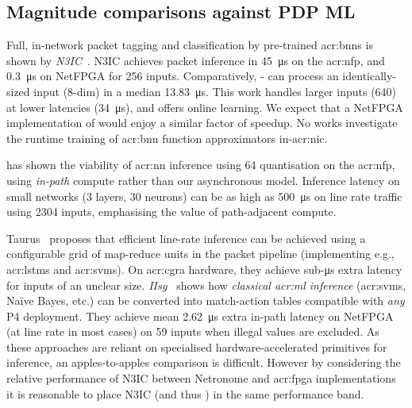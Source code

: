\subsection{Magnitude comparisons against PDP ML}
Full, in-network packet tagging and classification by pre-trained \glspl{acr:bnn} is shown by \emph{N3IC}~\parencite{DBLP:journals/corr/abs-2009-02353}.
N3IC achieves packet inference in \qty{45}{\micro\second} on the \gls{acr:nfp}, and \qty{0.3}{\micro\second} on NetFPGA for \qty{256}{\bit} inputs.
Comparatively, \approachshort{}-\Coopfw{} can process an identically-sized input (8-dim) in a median \qty{13.83}{\micro\second}.
This work handles larger inputs (\qty{640}{\bit}) at lower latencies (\qty{34}{\micro\second}), and offers online learning.
We expect that a NetFPGA implementation of \approachshort{} would enjoy a similar factor of speedup.
No works investigate the runtime training of \gls{acr:bnn} function approximators in-\gls{acr:nic}.

\textcite{langlet-ml-netronome} has shown the viability of \gls{acr:nn} inference using \qty{64}{\bit} quantisation on the \gls{acr:nfp}, using \emph{in-path} compute rather than our asynchronous model.
Inference latency on small networks (3 layers, \num{30} neurons) can be as high as \qty{500}{\micro\second} on line rate traffic using \qty{2304}{\bit} inputs, emphasising the value of path-adjacent compute.

Taurus~\parencite{DBLP:journals/corr/abs-2002-08987} proposes that efficient line-rate inference can be achieved using a configurable grid of map-reduce units in the packet pipeline (implementing e.g., \glspl{acr:lstm} and \glspl{acr:svm}).
On \gls{acr:cgra} hardware, they achieve sub-\si{\micro\second} extra latency for inputs of an unclear size.
\emph{IIsy}~\parencite{DBLP:conf/hotnets/XiongZ19} shows how \emph{classical \gls{acr:ml} inference} (\glspl{acr:svm}, Na\"{i}ve Bayes, etc.) can be converted into match-action tables compatible with \emph{any} P4 deployment.
They achieve mean \qty{2.62}{\micro\second} extra in-path latency on NetFPGA (at line rate in most cases) on \qty{59}{\bit} inputs when illegal values are excluded.
As these approaches are reliant on specialised hardware-accelerated primitives for inference, an apples-to-apples comparison is difficult.
However by considering the relative performance of N3IC between Netronome and \gls{acr:fpga} implementations it is reasonable to place N3IC (and thus \approachshort{}) in the same performance band.
